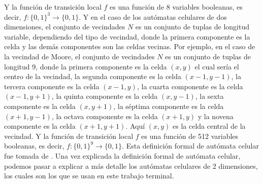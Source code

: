         Y la funci\'on de transici\'on local $f$ es una funci\'on de 8 variables booleanas, es decir, $f: \{0,1\}^3 \rightarrow \{0,1\}$.
    \vskip 0.5cm    
    Y en el caso de los aut\'omatas celulares de dos dimensiones, el conjunto de vecindades $N$ es un conjunto de tuplas de longitud variable, 
        dependiendo del tipo de vecindad, donde la primera componente es la celda y las dem\'as componentes son las celdas vecinas. Por ejemplo, 
        en el caso de la vecindad de Moore, el conjunto de vecindades $N$ es un conjunto de tuplas de longitud 9, donde la primera componente es la celda
        $(x,y)$ el cual ser\'ia el centro de la vecindad, la segunda componente es la celda $(x-1,y-1)$, la tercera componente es la celda $(x-1,y)$,
        la cuarta componente es la celda $(x-1,y+1)$, la quinta componente es la celda $(x,y-1)$, la sexta componente es la celda $(x,y+1)$, la s\'eptima
        componente es la celda $(x+1,y-1)$, la octava componente es la celda $(x+1,y)$ y la novena componente es la celda $(x+1,y+1)$. Aqu\'i 
        $(x,y)$ es la celda central de la vecindad. Y la funci\'on de transici\'on local $f$ es una funci\'on de 512 variables booleanas, es decir,
        $f: \{0,1\}^{9} \rightarrow \{0,1\}$.
    \vskip 0.5cm
    Esta definici\'on formal de aut\'omata celular fue tomada de \cite{Codd1968}. Una vez explicada la definici\'on formal de aut\'omata celular,
        podemos pasar a explicar a m\'as detalle los aut\'omatas celulares de 2 dimensiones, los cuales son los que se usan en este trabajo terminal.
    \vskip 0.5cm